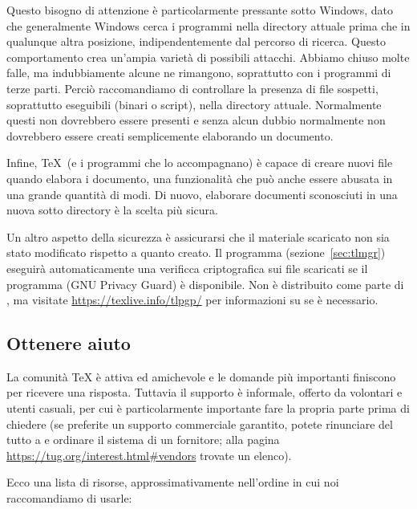 \documentclass{article}
\begin{document}
Questo bisogno di attenzione è particolarmente pressante sotto Windows,
dato che generalmente Windows cerca i programmi nella directory attuale
prima che in qualunque altra posizione, indipendentemente dal percorso di
ricerca. Questo comportamento crea un'ampia varietà di possibili attacchi.
Abbiamo chiuso molte falle, ma indubbiamente alcune ne rimangono,
soprattutto con i programmi di terze parti. Perciò raccomandiamo di
controllare la presenza di file sospetti, soprattutto eseguibili 
(binari o script), nella directory attuale. Normalmente questi non
dovrebbero essere presenti e senza alcun dubbio normalmente non dovrebbero
essere creati semplicemente elaborando un documento.

Infine, \TeX\ (e i programmi che lo accompagnano) è capace di creare nuovi
file quando elabora i documento, una funzionalità che può anche essere
abusata in una grande quantità di modi. Di nuovo, elaborare documenti
sconosciuti in una nuova sotto directory è la scelta più sicura.

Un altro aspetto della sicurezza è assicurarsi che il materiale scaricato
non sia stato modificato rispetto a quanto creato. Il programma
 (sezione~\ref{sec:tlmgr}) eseguirà automaticamente una
verificca criptografica sui file scaricati se il programma  (GNU
Privacy Guard) è disponibile. Non è distribuito come parte di \TL, ma
visitate \url{https://texlive.info/tlpgp/} per informazioni su 
se è necessario.


\subsection{Ottenere aiuto}
\label{sec:help}

La comunità \TeX{} è attiva ed amichevole e le domande più importanti
finiscono per ricevere una risposta. Tuttavia il supporto è informale,
offerto da volontari e utenti casuali, per cui è particolarmente
importante fare la propria parte prima di chiedere (se preferite un
supporto commerciale garantito, potete rinunciare del tutto a \TL{} e
ordinare il sistema di un fornitore; alla pagina
\url{https://tug.org/interest.html#vendors} trovate un elenco).

Ecco una lista di risorse, approssimativamente nell'ordine in cui noi
raccomandiamo di usarle:
\end{document}
